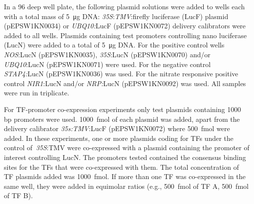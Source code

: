 \documentclass[../main.tex]{subfiles}
\begin{document}

In a 96 deep well plate, the following plasmid solutions were added to
wells each with a total mass of \SI{5}{\micro\gram} DNA: \textit{35S}:\textit{TMV}:firefly
luciferase (LucF) plasmid (pEPSW1KN0034) or \textit{UBQ10:}LucF
(pEPSW1KN0072) delivery calibrators were added to all wells. Plasmids
containing test promoters controlling nano luciferase (LucN) were added to a total of \SI{5}{\micro\gram} DNA. For the positive control wells \textit{NOS}:LucN
(pEPSW1KN0035), \textit{35S}:LucN (pEPSW1KN0070) and/or \textit{UBQ10}:LucN
(pEPSW1KN0071) were used. For the negative control \textit{STAP4:}LucN
(pEPSW1KN0036) was used. For the nitrate responsive positive
control \textit{NIR1}:LucN and/or \textit{NRP:}LucN (pEPSW1KN0092) was used. All samples were run in triplicate.

For TF\hyp{}promoter co\hyp{}expression experiments only test plasmids containing 1000 bp promoters were used. \SI{1000}{\fmol} of each plasmid was added, apart from the delivery calibrator \textit{35s:TMV}:LucF (pEPSW1KN0072) where \SI{500}{\fmol} were added.
In these experiments, one or more plasmids coding for TFs under the control of~\textit{35S}:TMV were co\hyp{}expressed with a plasmid containing the promoter of interest controlling LucN.
The promoters tested contained the consensus binding sites for the TFs that were co\hyp{}expressed with them.
The total concentration of TF plasmids added was \SI{1000}{\fmol}. If more than one TF was co-expressed in the same well, they were added in equimolar ratios (e.g., \SI{500}{\fmol} of TF A, \SI{500}{\fmol} of TF B).
\end{document}
